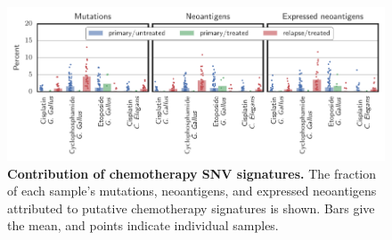 \begin{figure}[htbp]
\centering
\includegraphics[scale=1.0]{figures/sources_of_mutations_and_neoantigens_ungrouped.pdf}
\caption{\textbf{Contribution of chemotherapy SNV signatures.} The fraction of each sample's mutations, neoantigens, and expressed neoantigens attributed to putative chemotherapy signatures is shown. Bars give the mean, and points indicate individual samples.}
\label{fig:sourcesungrouped}
\end{figure}

\FloatBarrier
